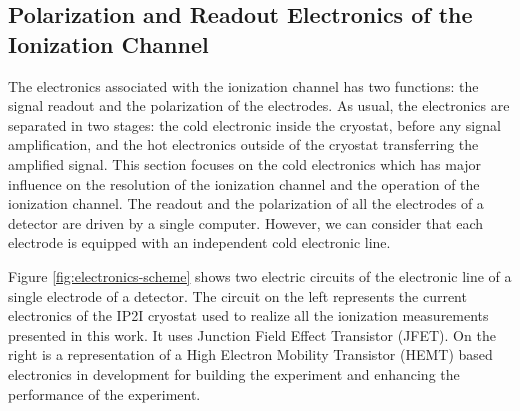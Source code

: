 

\subsection{Polarization and Readout Electronics of the Ionization Channel}
\label{par:electronics-ionization}
\label{par:ionization-electronics}
\label{par:adu-unit}
\label{par:reset-procedure}
\label{par:maintenance-procedure}


The electronics associated with the ionization channel has two functions: the signal readout and the polarization of the electrodes. As usual, the electronics are separated in two stages: the cold electronic inside the cryostat, before any signal amplification, and the hot electronics outside of the cryostat transferring the amplified signal. This section focuses on the cold electronics which has major influence on the resolution of the ionization channel and the operation of the ionization channel. The readout and the polarization of all the electrodes of a detector are driven by a single computer. However, we can  consider that each electrode is equipped with an independent cold electronic line.

Figure \ref{fig:electronics-scheme} shows two electric circuits of the electronic line of a single electrode of a detector. The circuit on the left represents the current electronics of the IP2I cryostat used to realize all the ionization measurements presented in this work. It uses Junction Field Effect Transistor (JFET). On the right is a representation of a High Electron Mobility Transistor (HEMT) based electronics in development for building the \Ricochet{} experiment \cite{Juillard:2019njs} and enhancing the performance of the \Edelweiss{} experiment.

